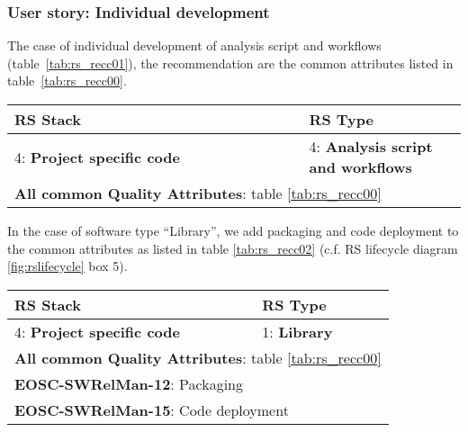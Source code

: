 \subsubsection{User story: Individual development}

The case of individual development of analysis script and workflows (table~\ref{tab:rs_recc01}), the recommendation are the common attributes listed in table~\ref{tab:rs_recc00}.

\begin{center}
  \label{tab:rs_recc01}
  \small
  \begin{tabular}{|p{0.65\linewidth}|p{0.35\linewidth}|} \hline

    \textbf{RS Stack} & \textbf{RS Type} \\ \hline \hline
    4: \textbf{Project specific code} &
    4: \textbf{Analysis script and workflows} \\ \hline \hline
    \multicolumn{2}{|l|}{\textbf{All common Quality Attributes}: table \ref{tab:rs_recc00}} \\ \hline

  \end{tabular}
\end{center}

In the case of software type ``Library'', we add packaging and code deployment to the common attributes as listed in table \ref{tab:rs_recc02} (c.f. RS lifecycle diagram \ref{fig:rslifecycle} box 5).

\begin{center}
  \label{tab:rs_recc02}
  \small
  \begin{tabular}{|p{0.65\linewidth}|p{0.35\linewidth}|} \hline

    \textbf{RS Stack} & \textbf{RS Type} \\ \hline \hline
    4: \textbf{Project specific code} &
    1: \textbf{Library} \\ \hline \hline
    \multicolumn{2}{|l|}{\textbf{All common Quality Attributes}: table \ref{tab:rs_recc00}} \\ \hline
    \multicolumn{2}{|l|}{\textbf{EOSC-SWRelMan-12}: Packaging} \\ \hline
    \multicolumn{2}{|l|}{\textbf{EOSC-SWRelMan-15}: Code deployment} \\ \hline

  \end{tabular}
\end{center}

